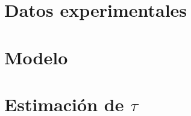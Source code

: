 \documentclass[12pt,a4paper]{article}
\begin{document}
\section{Datos experimentales}

\section{Modelo}

\section{Estimación de $\tau$}
\end{document}
